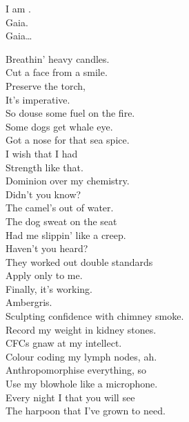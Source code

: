 I am . \\
Gaia. \\

Gaia… \\





Breathin' heavy candles. \\
Cut a face from a smile. \\
Preserve the torch, \\
It's imperative. \\
So douse some fuel on the fire. \\

Some dogs get whale eye. \\
Got a nose for that sea spice. \\
I wish that I had \\
Strength like that. \\
Dominion over my chemistry. \\

Didn't you know? \\
The camel's out of water. \\
The dog sweat on the seat \\
Had me slippin' like a creep. \\

Haven't you heard? \\
They worked out double standards \\
Apply only to me. \\
Finally, it's working. \\
Ambergris. \\

Sculpting confidence with chimney smoke. \\
Record my weight in kidney stones. \\
CFCs gnaw at my intellect. \\
Colour coding my lymph nodes, ah. \\

Anthropomorphise everything, so \\
Use my blowhole like a microphone. \\
Every night I  that you will see \\
The harpoon that I've grown to need. \\

